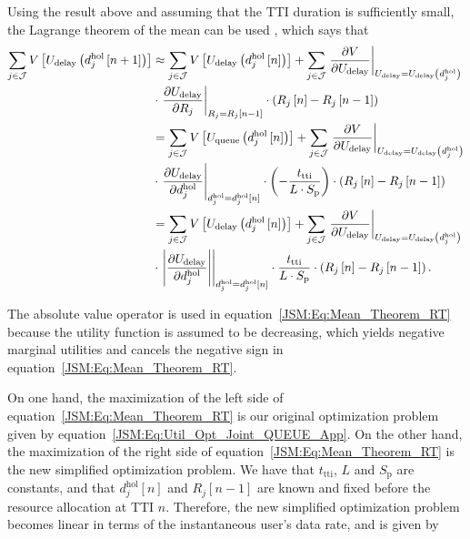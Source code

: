 \begin{apendicesenv}
Using the result above and assuming that the \ac{TTI} duration is sufficiently small, the Lagrange theorem of the mean can be used \cite{lei2007packet,Phd:Emanuel2011}, which says that 
%
\begin{align}
\label{JSM:Eq:Mean_Theorem_RT}
\sum_{j \in \mathcal{J}} V\left[U_{\mathrm{delay}}\left( d_{j}^{\mathrm{hol}}\left[n+1\right]\right)\right] & \approx \sum_{j \in \mathcal{J}} V\left[U_{\mathrm{delay}}\left(d_{j}^{\mathrm{hol}}\left[n\right]\right)\right] + \sum_{j \in \mathcal{J}} \left.\dfrac{\partial V}{\partial U_{\mathrm{delay}}}\right\vert_{U_{\mathrm{delay}} = U_{\mathrm{delay}}\left(d_j^\mathrm{hol}\right)}  \notag \\ & \cdot \left.\dfrac{\partial U_{\mathrm{delay}}}{\partial R_j}\right\vert_{R_j=R_j\left[n-1\right]} \cdot \left( R_j\left[n\right] - R_j\left[n-1\right]\right) \notag \\ & = 
\sum_{j \in \mathcal{J}} V\left[U_{\mathrm{queue}}\left(d_{j}^{\mathrm{hol}}\left[n\right]\right)\right]  + \sum_{j \in \mathcal{J}} \left.\dfrac{\partial V}{\partial U_{\mathrm{delay}}}\right\vert_{U_{\mathrm{delay}} = U_{\mathrm{delay}}\left(d_j^\mathrm{hol}\right)} \notag \\ & \cdot \left.\dfrac{\partial U_{\mathrm{delay}}}{\partial d_{j}^\mathrm{hol}}\right\vert_{d_{j}^\mathrm{hol} = d_{j}^\mathrm{hol}\left[n\right]} \cdot \left(-\frac{t_{\mathrm{tti}}}{L \cdot S_\mathrm{p}}\right) \cdot \left( R_j\left[n\right] - R_j\left[n-1\right]\right) \notag \\ & = 
\sum_{j \in \mathcal{J}} V\left[U_{\mathrm{delay}}\left(d_{j}^{\mathrm{hol}}\left[n\right]\right)\right] + \sum_{j \in \mathcal{J}} \left.\dfrac{\partial V}{\partial U_{\mathrm{delay}}}\right\vert_{U_{\mathrm{delay}} = U_{\mathrm{delay}}\left(d_j^\mathrm{hol}\right)} \notag \\ & \cdot \left.\left| \dfrac{\partial U_{\mathrm{delay}}}{\partial d_{j}^\mathrm{hol}} \right|\right\vert_{d_{j}^\mathrm{hol} = d_{j}^\mathrm{hol}\left[n\right]}  \cdot \frac{t_{\mathrm{tti}}}{L \cdot S_\mathrm{p}} \cdot \left( R_j\left[n\right] - R_j\left[n-1\right]\right).
\end{align}

The absolute value operator is used in equation~\eqref{JSM:Eq:Mean_Theorem_RT} because the utility function is assumed to be decreasing, which yields negative marginal utilities and cancels the negative sign in equation~\eqref{JSM:Eq:Mean_Theorem_RT}.

On one hand, the maximization of the left side of equation~\eqref{JSM:Eq:Mean_Theorem_RT} is our original optimization problem given by equation~\eqref{JSM:Eq:Util_Opt_Joint_QUEUE_App}. On the other hand, the maximization of the right side of equation~\eqref{JSM:Eq:Mean_Theorem_RT} is the new simplified optimization problem. We have that $t_{\mathrm{tti}}$, $L$ and $S_\mathrm{p}$ are constants, and that $d_{j}^{\mathrm{hol}}\left[n\right]$ and $R_j\left[n-1\right]$ are known and fixed before the resource allocation at \ac{TTI} $n$. Therefore, the new simplified optimization problem becomes linear in terms of the instantaneous user's data rate, and is given by


\end{apendicesenv}
